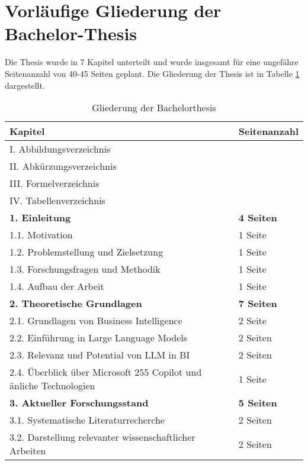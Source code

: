 
\section{Vorläufige Gliederung der Bachelor-Thesis}

Die Thesis wurde in 7 Kapitel unterteilt und wurde insgesamt für eine ungefähre Seitenanzahl von 40-45 Seiten geplant. Die Gliederung der Thesis ist in Tabelle \ref{tab:gliederung} dargestellt.

\begin{longtable}{|p{9cm}|p{2.5cm}|}
    \caption{Gliederung der Bachelorthesis} \label{tab:gliederung} \\
    \hline
    \textbf{Kapitel} & \textbf{Seitenanzahl} \\
    \hline
    I.      Abbildungsverzeichnis & \\
    \hline
    II.     Abkürzungsverzeichnis & \\
    \hline
    III.    Formelverzeichnis & \\
    \hline
    IV.     Tabellenverzeichnis & \\
    \hline
    \textbf{1. Einleitung} & \textbf{4 Seiten} \\
    \hline
        1.1. Motivation & 1 Seite \\
        \hline
        1.2. Problemstellung und Zielsetzung & 1 Seite \\
        \hline
        1.3. Forschungsfragen und Methodik & 1 Seite \\
        \hline
        1.4. Aufbau der Arbeit & 1 Seite \\
    \hline
    \textbf{2. Theoretische Grundlagen} & \textbf{7 Seiten} \\
    \hline
        2.1. Grundlagen von Business Intelligence & 2 Seite \\
        \hline
        2.2. Einführung in Large Language Models & 2 Seiten \\
        \hline
        2.3. Relevanz und Potential von LLM in BI & 2 Seiten \\
        \hline
        2.4. Überblick über Microsoft 255 Copilot und änliche Technologien & 1 Seite \\
    \hline
    \textbf{3. Aktueller Forschungsstand} & \textbf{5 Seiten} \\
    \hline
        3.1. Systematische Literaturrecherche & 2 Seiten \\
        \hline
        3.2. Darstellung relevanter wissenschaftlicher Arbeiten & 2 Seiten \\

\end{longtable}
